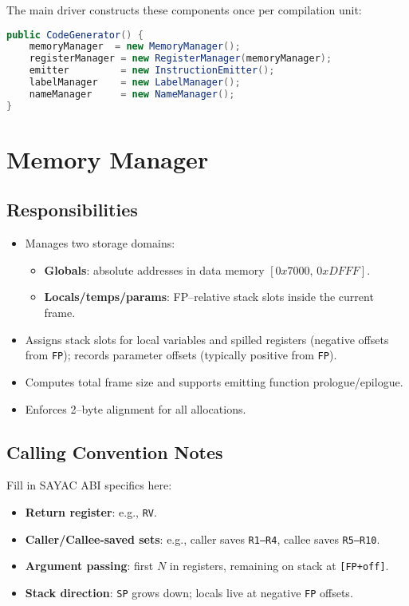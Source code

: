 \documentclass[12pt,a4paper]{report}
\begin{document}
The main driver constructs these components once per compilation unit:
\begin{lstlisting}[language=Java, style=code, caption={Back-end driver initialization}]
public CodeGenerator() {
    memoryManager  = new MemoryManager();
    registerManager = new RegisterManager(memoryManager);
    emitter         = new InstructionEmitter();
    labelManager    = new LabelManager();
    nameManager     = new NameManager();
}
\end{lstlisting}

\section{Memory Manager}

\subsection{Responsibilities}
\begin{itemize}
    \item Manages two storage domains:
    \begin{itemize}
        \item \textbf{Globals}: absolute addresses in data memory \([0x7000,\,0xDFFF]\).
        \item \textbf{Locals/temps/params}: FP–relative stack slots inside the current frame.
    \end{itemize}
    \item Assigns stack slots for local variables and spilled registers (negative offsets from \texttt{FP}); records parameter offsets (typically positive from \texttt{FP}).
    \item Computes total frame size and supports emitting function prologue/epilogue.
    \item Enforces 2–byte alignment for all allocations.
\end{itemize}

\subsection{Calling Convention Notes}
Fill in SAYAC ABI specifics here:
\begin{itemize}
    \item \textbf{Return register}: e.g., \texttt{RV}.
    \item \textbf{Caller/Callee-saved sets}: e.g., caller saves \texttt{R1–R4}, callee saves \texttt{R5–R10}.
    \item \textbf{Argument passing}: first \(N\) in registers, remaining on stack at \texttt{[FP+off]}.
    \item \textbf{Stack direction}: \texttt{SP} grows down; locals live at negative \texttt{FP} offsets.
\end{itemize}
\end{document}
